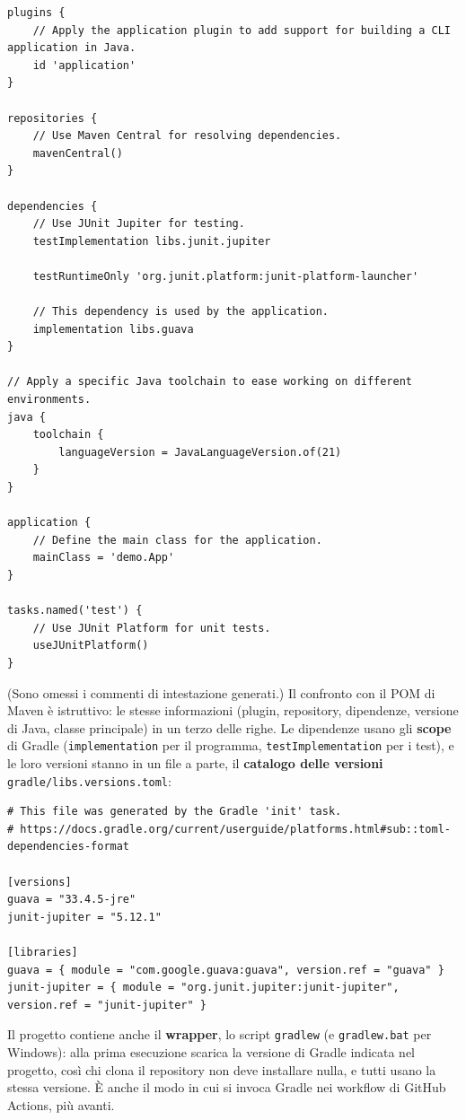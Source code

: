 \begin{lstlisting}[style=gradle, name=app/build.gradle]
plugins {
    // Apply the application plugin to add support for building a CLI application in Java.
    id 'application'
}

repositories {
    // Use Maven Central for resolving dependencies.
    mavenCentral()
}

dependencies {
    // Use JUnit Jupiter for testing.
    testImplementation libs.junit.jupiter

    testRuntimeOnly 'org.junit.platform:junit-platform-launcher'

    // This dependency is used by the application.
    implementation libs.guava
}

// Apply a specific Java toolchain to ease working on different environments.
java {
    toolchain {
        languageVersion = JavaLanguageVersion.of(21)
    }
}

application {
    // Define the main class for the application.
    mainClass = 'demo.App'
}

tasks.named('test') {
    // Use JUnit Platform for unit tests.
    useJUnitPlatform()
}
\end{lstlisting}

(Sono omessi i commenti di intestazione generati.) Il confronto con il POM di Maven è istruttivo: le stesse informazioni
(plugin, repository, dipendenze, versione di Java, classe principale) in un terzo delle righe. Le dipendenze usano gli
\textbf{scope} di Gradle (\texttt{implementation} per il programma, \texttt{testImplementation} per i test), e le loro
versioni stanno in un file a parte, il \textbf{catalogo delle versioni} \texttt{gradle/libs.versions.toml}:

\begin{lstlisting}[style=conf, name=gradle/libs.versions.toml]
# This file was generated by the Gradle 'init' task.
# https://docs.gradle.org/current/userguide/platforms.html#sub::toml-dependencies-format

[versions]
guava = "33.4.5-jre"
junit-jupiter = "5.12.1"

[libraries]
guava = { module = "com.google.guava:guava", version.ref = "guava" }
junit-jupiter = { module = "org.junit.jupiter:junit-jupiter", version.ref = "junit-jupiter" }
\end{lstlisting}

Il progetto contiene anche il \textbf{wrapper}, lo script \texttt{gradlew} (e \texttt{gradlew.bat} per Windows): alla
prima esecuzione scarica la versione di Gradle indicata nel progetto, così chi clona il repository non deve installare
nulla, e tutti usano la stessa versione. È anche il modo in cui si invoca Gradle nei workflow di GitHub Actions, più
avanti.

